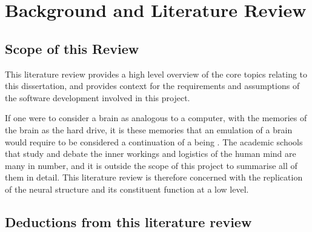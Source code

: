 \chapter{Background and Literature Review}

\section{Scope of this Review}
This literature review provides a high level overview of the core topics relating to this dissertation, and provides context for the requirements and assumptions of the software development involved in this project. 

If one were to consider a brain as analogous to a computer, with the memories of
the brain as the hard drive, it is these memories that an  emulation of a brain
would require to be considered a continuation of a being
\autocite{eichenbaum_cognitive_2011}. The academic schools that study and debate
the inner workings and logistics of the human mind are many in number, and it is
outside the scope of this project to summarise all of them in detail.  This
literature review is therefore concerned with the replication of the neural
structure and its constituent function at a low level.







\section{Deductions from this literature review}

